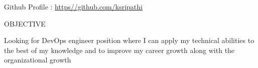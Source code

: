\documentclass{resume} %
\newcommand{\blank}[1]{\hspace*{#1}}
\begin{document}
\blank{5 cm}
{Github Profile : }
\url{https//github.com/ksripathi}

\begin{rSection}{OBJECTIVE}
  
  { Looking for DevOps engineer position where I can apply my technical
    abilities to the best of my knowledge and to improve my career growth along
    with the organizational growth }


\end{rSection}


\end{document}
